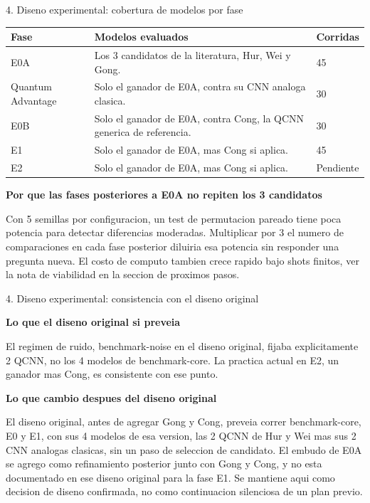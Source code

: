 \documentclass[aspectratio=169]{beamer}
\newcommand{\bmheading}[2]{\textbf{\color{#1}#2}\par\smallskip}
\newcommand{\bandedtable}{\rowcolors{2}{white}{bmRowAlt}}
\begin{document}
\begin{frame}{4. Diseno experimental: cobertura de modelos por fase}
  \footnotesize
  \bandedtable
  \begin{tabular}{@{}p{2.3cm}p{6.4cm}p{3.1cm}@{}}
    \toprule
    \textbf{Fase} & \textbf{Modelos evaluados} & \textbf{Corridas} \\
    \midrule
    E0A & Los 3 candidatos de la literatura, Hur, Wei y Gong. & 45 \\
    Quantum Advantage & Solo el ganador de E0A, contra su CNN analoga clasica. & 30 \\
    E0B & Solo el ganador de E0A, contra Cong, la QCNN generica de referencia. & 30 \\
    E1 & Solo el ganador de E0A, mas Cong si aplica. & 45 \\
    E2 & Solo el ganador de E0A, mas Cong si aplica. & Pendiente \\
    \bottomrule
  \end{tabular}

  \vspace{8pt}
  \begin{amberbox}
    \bmheading{bmAmber}{Por que las fases posteriores a E0A no repiten los 3 candidatos}
    Con 5 semillas por configuracion, un test de permutacion pareado tiene poca potencia
    para detectar diferencias moderadas. Multiplicar por 3 el numero de comparaciones en
    cada fase posterior diluiria esa potencia sin responder una pregunta nueva. El costo
    de computo tambien crece rapido bajo shots finitos, ver la nota de viabilidad en la
    seccion de proximos pasos.
  \end{amberbox}
\end{frame}

\begin{frame}{4. Diseno experimental: consistencia con el diseno original}
  \footnotesize
  \begin{bluebox}
    \bmheading{bmBlue}{Lo que el diseno original si preveia}
    El regimen de ruido, benchmark-noise en el diseno original, fijaba explicitamente 2
    QCNN, no los 4 modelos de benchmark-core. La practica actual en E2, un ganador mas
    Cong, es consistente con ese punto.
  \end{bluebox}

  \vspace{10pt}

  \begin{amberbox}
    \bmheading{bmAmber}{Lo que cambio despues del diseno original}
    El diseno original, antes de agregar Gong y Cong, preveia correr benchmark-core, E0 y
    E1, con sus 4 modelos de esa version, las 2 QCNN de Hur y Wei mas sus 2 CNN analogas
    clasicas, sin un paso de seleccion de candidato. El embudo de E0A se agrego como
    refinamiento posterior junto con Gong y Cong, y no esta documentado en ese diseno
    original para la fase E1. Se mantiene aqui como decision de diseno confirmada, no
    como continuacion silenciosa de un plan previo.
  \end{amberbox}
\end{frame}
\end{document}
